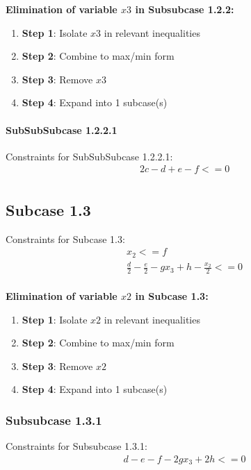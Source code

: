 \documentclass{article}
\begin{document}
\textbf{Elimination of variable $x3$ in Subsubcase 1.2.2:}

\begin{enumerate}
\item \textbf{Step 1}: Isolate $x3$ in relevant inequalities
\item \textbf{Step 2}: Combine to max/min form
\item \textbf{Step 3}: Remove $x3$
\item \textbf{Step 4}: Expand into 1 subcase(s)
\end{enumerate}

\paragraph{SubSubSubcase 1.2.2.1}

Constraints for SubSubSubcase 1.2.2.1:
\begin{align}
& 2 c - d + e - f <= 0 \\
\end{align}

\subsection{Subcase 1.3}

Constraints for Subcase 1.3:
\begin{align}
& x_{2} <= f \\
& \frac{d}{2} - \frac{e}{2} - g x_{3} + h - \frac{x_{2}}{2} <= 0 \\
\end{align}

\textbf{Elimination of variable $x2$ in Subcase 1.3:}

\begin{enumerate}
\item \textbf{Step 1}: Isolate $x2$ in relevant inequalities
\item \textbf{Step 2}: Combine to max/min form
\item \textbf{Step 3}: Remove $x2$
\item \textbf{Step 4}: Expand into 1 subcase(s)
\end{enumerate}

\subsubsection{Subsubcase 1.3.1}

Constraints for Subsubcase 1.3.1:
\begin{align}
& d - e - f - 2 g x_{3} + 2 h <= 0 \\
\end{align}
\end{document}
